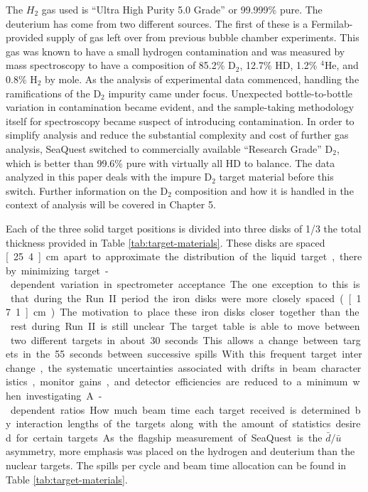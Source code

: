The $H_2$ gas used is ``Ultra High Purity 5.0 Grade'' or 99.999\% pure.  The deuterium has come from two different sources.  The first of these is a Fermilab-provided supply of gas left over from previous bubble chamber experiments. This gas was known to have a small hydrogen contamination and was measured by mass spectroscopy to have a composition of 85.2\% D$_2$, 12.7\% HD, 1.2\% $^4$He, and 0.8\% H$_2$ by mole. As the analysis of experimental data commenced, handling the ramifications of the D$_2$ impurity came under focus. Unexpected bottle-to-bottle variation in contamination became evident, and the sample-taking methodology itself for spectroscopy became suspect of introducing contamination. In order to simplify analysis and reduce the substantial complexity and cost of further gas analysis, SeaQuest switched to commercially available ``Research Grade'' D$_2$, which is better than 99.6\% pure with virtually all HD to balance. The data analyzed in this paper deals with the impure D$_2$ target material before this switch. Further information on the D$_2$ composition and how it is handled in the context of analysis will be covered in Chapter 5.

Each of the three solid target positions is divided into three disks of 1/3 the total thickness provided in Table \ref{tab:target-materials}. These disks are spaced \unit[25.4]{cm} apart to approximate the distribution of the liquid target, thereby minimizing target-dependent variation in spectrometer acceptance. The one exception to this is that during the Run II period the iron disks were more closely spaced (\unit[17.1]{cm}). The motivation to place these iron disks closer together than the rest during Run II is still unclear.

The target table is able to move between two different targets in about 30 seconds. This allows a change between targets in the 55 seconds between successive spills. With this frequent target interchange, the systematic uncertainties associated with drifts in beam characteristics, monitor gains, and detector efficiencies are reduced to a minimum when investigating A-dependent ratios. How much beam time each target received is determined by interaction lengths of the targets along with the amount of statistics desired for certain targets. As the flagship measurement of SeaQuest is the $\bar{d}/\bar{u}$ asymmetry, more emphasis was placed on the hydrogen and deuterium than the nuclear targets. The spills per cycle and beam time allocation can be found in Table \ref{tab:target-materials}.

